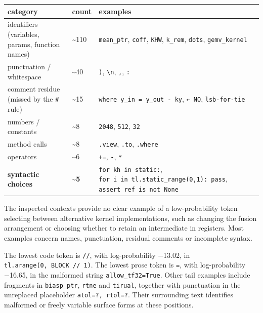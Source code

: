 \documentclass[
  11pt,
]{article}
\begin{document}
\begin{center}
\begin{minipage}{\linewidth}
\centering
\begin{tabular}{@{}
  >{\raggedright\arraybackslash}p{}
  >{\raggedright\arraybackslash}p{}
  >{\raggedright\arraybackslash}p{}@{}}
\toprule
category & count & examples \\
\midrule

identifiers (variables, params, function names) & \textasciitilde110 &
\texttt{mean\_ptr}, \texttt{coff}, \texttt{KHW}, \texttt{k\_rem},
\texttt{dots}, \texttt{gemv\_kernel} \\
punctuation / whitespace & \textasciitilde40 & \texttt{)},
\texttt{\textbackslash{}n}, \texttt{,}, \texttt{:} \\
comment residue (missed by the \texttt{\#} rule) & \textasciitilde15 &
\texttt{where\ y\_in\ =\ y\_out\ -\ ky}, \texttt{←\ NO},
\texttt{lsb-for-tie} \\
numbers / constants & \textasciitilde8 & \texttt{2048}, \texttt{512},
\texttt{32} \\
method calls & \textasciitilde8 & \texttt{.view}, \texttt{.to},
\texttt{.where} \\
operators & \textasciitilde6 & \texttt{+=}, \texttt{-}, \texttt{*} \\
\textbf{syntactic choices} & \textbf{\textasciitilde5} &
\texttt{for\ kh\ in\ static:},
\texttt{for\ i\ in\ tl.static\_range(0,1):\ pass},
\texttt{assert\ ref\ is\ not\ None} \\
\bottomrule
\end{tabular}
\end{minipage}
\end{center}

The inspected contexts provide no clear example of a low-probability
token selecting between alternative kernel implementations, such as
changing the fusion arrangement or choosing whether to retain an
intermediate in registers. Most examples concern names, punctuation,
residual comments or incomplete syntax.

The lowest code token is \texttt{//}, with log-probability −13.02, in
\texttt{tl.arange(0,\ BLOCK\ //\ 1)}. The lowest prose token is
\texttt{\textbar{}=}, with log-probability −16.65, in the malformed
string \texttt{allow\_tf32\textbar{}=\textbar{}True}. Other tail
examples include fragments in \texttt{biasp\_ptr}, \texttt{rtne} and
\texttt{tirual}, together with punctuation in the unreplaced placeholder
\texttt{atol=?,\ rtol=?}. Their surrounding text identifies malformed or
freely variable surface forms at these positions.
\end{document}

